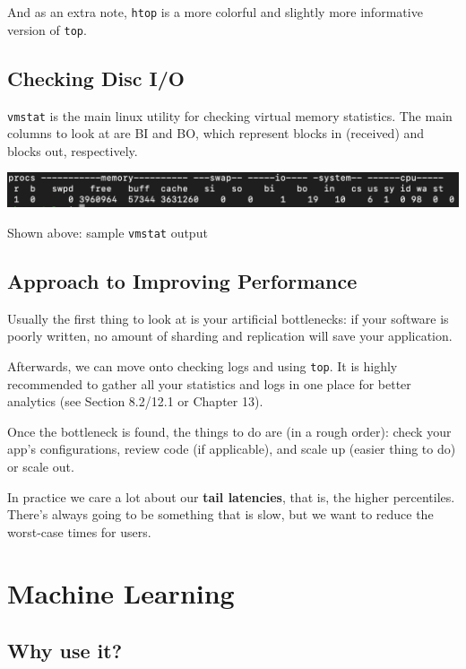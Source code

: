 \documentclass{report}
\newcommand{\npar}{\par\noindent}
\newcommand{\vpar}{\vspace{1em}\npar}
\begin{document}
\npar And as an extra note, \verb|htop| is a more colorful and slightly more informative version of \verb|top|.

\newpage
\section{Checking Disc I/O}

\par \verb|vmstat| is the main linux utility for checking virtual memory statistics. The main columns to look at are BI and BO, which represent blocks in (received) and blocks out, respectively.

\begin{center}
    \includegraphics[scale=0.60]{10-3.png}
    \par Shown above: sample \verb|vmstat| output
\end{center}

\section{Approach to Improving Performance}

\par Usually the first thing to look at is your artificial bottlenecks: if your software is poorly written, no amount of sharding and replication will save your application.

\vpar Afterwards, we can move onto checking logs and using \verb|top|. It is highly recommended to gather all your statistics and logs in one place for better analytics (see Section 8.2/12.1 or Chapter 13).

\vpar Once the bottleneck is found, the things to do are (in a rough order): check your app's configurations, review code (if applicable), and scale up (easier thing to do) or scale out.

\vpar In practice we care a lot about our \textbf{tail latencies}, that is, the higher percentiles. There's always going to be something that is slow, but we want to reduce the worst-case times for users.

\chapter{Machine Learning}

\section{Why use it?}
\end{document}
